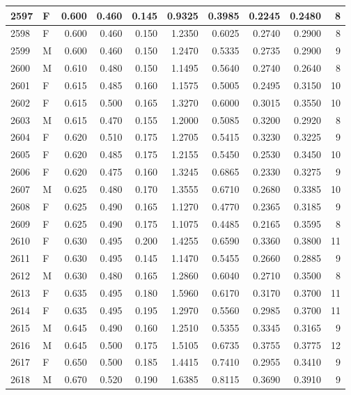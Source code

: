 \documentclass[9pt,twocolumn,twoside,]{pnas-new}
\begin{document}
\begin{tabular}{l|l|r|r|r|r|r|r|r|r}
\hline
2597 & F & 0.600 & 0.460 & 0.145 & 0.9325 & 0.3985 & 0.2245 & 0.2480 & 8\\
\hline
2598 & F & 0.600 & 0.460 & 0.150 & 1.2350 & 0.6025 & 0.2740 & 0.2900 & 8\\
\hline
2599 & M & 0.600 & 0.460 & 0.150 & 1.2470 & 0.5335 & 0.2735 & 0.2900 & 9\\
\hline
2600 & M & 0.610 & 0.480 & 0.150 & 1.1495 & 0.5640 & 0.2740 & 0.2640 & 8\\
\hline
2601 & F & 0.615 & 0.485 & 0.160 & 1.1575 & 0.5005 & 0.2495 & 0.3150 & 10\\
\hline
2602 & F & 0.615 & 0.500 & 0.165 & 1.3270 & 0.6000 & 0.3015 & 0.3550 & 10\\
\hline
2603 & M & 0.615 & 0.470 & 0.155 & 1.2000 & 0.5085 & 0.3200 & 0.2920 & 8\\
\hline
2604 & F & 0.620 & 0.510 & 0.175 & 1.2705 & 0.5415 & 0.3230 & 0.3225 & 9\\
\hline
2605 & F & 0.620 & 0.485 & 0.175 & 1.2155 & 0.5450 & 0.2530 & 0.3450 & 10\\
\hline
2606 & F & 0.620 & 0.475 & 0.160 & 1.3245 & 0.6865 & 0.2330 & 0.3275 & 9\\
\hline
2607 & M & 0.625 & 0.480 & 0.170 & 1.3555 & 0.6710 & 0.2680 & 0.3385 & 10\\
\hline
2608 & F & 0.625 & 0.490 & 0.165 & 1.1270 & 0.4770 & 0.2365 & 0.3185 & 9\\
\hline
2609 & F & 0.625 & 0.490 & 0.175 & 1.1075 & 0.4485 & 0.2165 & 0.3595 & 8\\
\hline
2610 & F & 0.630 & 0.495 & 0.200 & 1.4255 & 0.6590 & 0.3360 & 0.3800 & 11\\
\hline
2611 & F & 0.630 & 0.495 & 0.145 & 1.1470 & 0.5455 & 0.2660 & 0.2885 & 9\\
\hline
2612 & M & 0.630 & 0.480 & 0.165 & 1.2860 & 0.6040 & 0.2710 & 0.3500 & 8\\
\hline
2613 & F & 0.635 & 0.495 & 0.180 & 1.5960 & 0.6170 & 0.3170 & 0.3700 & 11\\
\hline
2614 & F & 0.635 & 0.495 & 0.195 & 1.2970 & 0.5560 & 0.2985 & 0.3700 & 11\\
\hline
2615 & M & 0.645 & 0.490 & 0.160 & 1.2510 & 0.5355 & 0.3345 & 0.3165 & 9\\
\hline
2616 & M & 0.645 & 0.500 & 0.175 & 1.5105 & 0.6735 & 0.3755 & 0.3775 & 12\\
\hline
2617 & F & 0.650 & 0.500 & 0.185 & 1.4415 & 0.7410 & 0.2955 & 0.3410 & 9\\
\hline
2618 & M & 0.670 & 0.520 & 0.190 & 1.6385 & 0.8115 & 0.3690 & 0.3910 & 9\\

\end{tabular}
\end{document}
